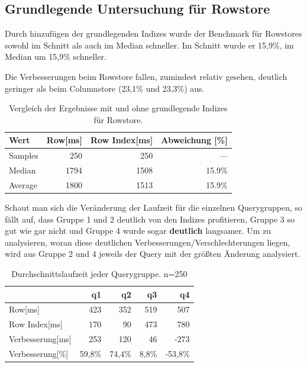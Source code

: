 \subsection{Grundlegende Untersuchung für Rowstore}
Durch hinzufügen der grundlegenden Indizes wurde der Benchmark
für Rowstores sowohl im Schnitt als auch im Median schneller.
Im Schnitt wurde er 15,9\%, im Median um 15,9\% schneller.

Die Verbesserungen beim Rowstore fallen, zumindest relativ gesehen, deutlich geringer als beim Columnstore (23,1\% und 23,3\%) aus.

\begin{table}[H]
    \begin{tabularx}{\textwidth}{lrrr}
        \toprule
        Wert                & Row[ms] & Row Index[ms]   & Abweichung [\%]\\
        \toprule
        Samples             & 250      & 250            &   ---    \\
        \midrule
        Median              & 1794     & 1508           &  15.9\%     \\
        Average             & 1800     & 1513           &  15.9\%     \\
        \bottomrule
    \end{tabularx}
\caption{Vergleich der Ergebnisse mit und ohne grundlegende Indizes für Rowstore.}
\label{tab:basic_index_row}
\end{table}

Schaut man sich die Veränderung der Laufzeit für die einzelnen Querygruppen, so fällt auf, dass Gruppe 1 und 2 deutlich von den Indizes profitieren, Gruppe 3 so gut wie gar nicht und Gruppe 4 wurde sogar \textbf{deutlich} langsamer.
Um zu analysieren, woran diese deutlichen Verbesserungen/Verschlechterungen liegen, wird aus Gruppe 2 und 4 jeweils der Query mit der größten Änderung analysiert.

\begin{table}[H]
    \begin{tabularx}{\linewidth}{lrrrr}
        \toprule
                            &   q1          &   q2      &	q3      & q4          \\
        \toprule
        Row[ms]	            &	423	        &	352	    &	519	    & 507	      \\
        Row Index[ms]       &   170         &   90	    &   473	    & 780	      \\
        Verbesserung[ms]    &   253         &   120     &   46      & -273        \\
        Verbesserung[\%]    &   59,8\%      &   74,4\%  &   8,8\%   & -53,8\%     \\    
\bottomrule
\end{tabularx}
\caption{Durchschnittslaufzeit jeder Querygruppe. n=250}
\label{tab:basic_index_row}
\end{table}



